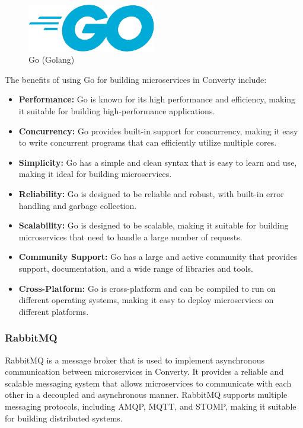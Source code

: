 \begin{figure}[H]
    \centering
    \includegraphics[width=0.5\textwidth]{Images/golang2.png}
    \caption{Go (Golang)}
    \label{fig:golang}
\end{figure}

The benefits of using Go for building microservices in Converty include:

\begin{itemize}
    \item \textbf{Performance:} Go is known for its high performance and efficiency, making it suitable for building high-performance applications.
    \item \textbf{Concurrency:} Go provides built-in support for concurrency, making it easy to write concurrent programs that can efficiently utilize multiple cores.
    \item \textbf{Simplicity:} Go has a simple and clean syntax that is easy to learn and use, making it ideal for building microservices.
    \item \textbf{Reliability:} Go is designed to be reliable and robust, with built-in error handling and garbage collection.
    \item \textbf{Scalability:} Go is designed to be scalable, making it suitable for building microservices that need to handle a large number of requests.
    \item \textbf{Community Support:} Go has a large and active community that provides support, documentation, and a wide range of libraries and tools.
    \item \textbf{Cross-Platform:} Go is cross-platform and can be compiled to run on different operating systems, making it easy to deploy microservices on different platforms.
\end{itemize}

\subsubsection{RabbitMQ}
RabbitMQ is a message broker that is used to implement asynchronous communication between microservices in Converty. It provides a reliable and scalable messaging system that allows microservices to communicate with each other in a decoupled and asynchronous manner. RabbitMQ supports multiple messaging protocols, including AMQP, MQTT, and STOMP, making it suitable for building distributed systems.

